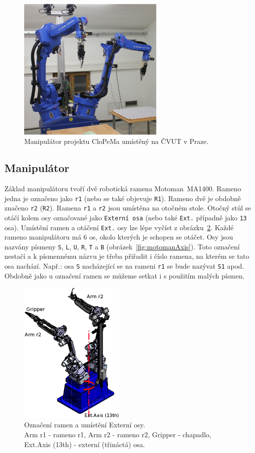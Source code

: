 \documentclass[10pt,a4paper,titlepage,oneside]{report}
\begin{document}
\begin{figure}[H]
	\centering  	
  	\includegraphics[height=7cm]{pictures/robotCTU.eps}
  	\caption[]{Manipulátor projektu CloPeMa umístěný na ČVUT v Praze.}
  	\label{fig:manipulatorCVUT}
\end{figure}

\subsection{Manipulátor}
\label{subsec:manipulator}

Základ manipulátoru tvoří dvě robotická ramena Motoman~MA1400. Rameno jedna je označeno jako \verb|r1| (nebo se také objevuje \verb|R1|). Rameno dvě je obdobně značeno \verb|r2| (\verb|R2|). Ramena \verb|r1| a \verb|r2| jsou umístěna na otočném stole. Otočný stůl se otáčí kolem osy označované jako \verb|Externí osa| (nebo také \verb|Ext.| případně jako \verb|13| osa). Umístění ramen a otáčení \verb|Ext.| osy lze lépe vyčíst z obrázku~\ref{fig:motomanAndTable}. Každé rameno manipulátoru má 6 os, okolo kterých je schopen se otáčet. Osy jsou nazvány písmeny \verb|S|, \verb|L|, \verb|U|, \verb|R|, \verb|T| a \verb|B| (obrázek~\ref{fig:motomanAxis}). Toto označení nestačí a k písmennému názvu je třeba přiřadit i číslo ramena, na kterém se tato osa nachází. Např.: osa \verb|S| nacházející se na rameni \verb|r1| se bude nazývat \verb|S1| apod. Obdobně jako u označení ramen se můžeme setkat i s použitím malých písmen.
\begin{figure}[H]
	\centering  	
  	\includegraphics[height=7cm]{pictures/motomanCelek.eps}
  	\caption[]{Označení ramen a umístění Externí osy.\\
	Arm r1 - rameno r1,
	Arm r2 - rameno r2,
	Gripper - chapadlo,
	Ext.Axis (13th) - externí (třináctá) osa.	  	
  	}
  	\label{fig:motomanAndTable}
\end{figure}
\end{document}
